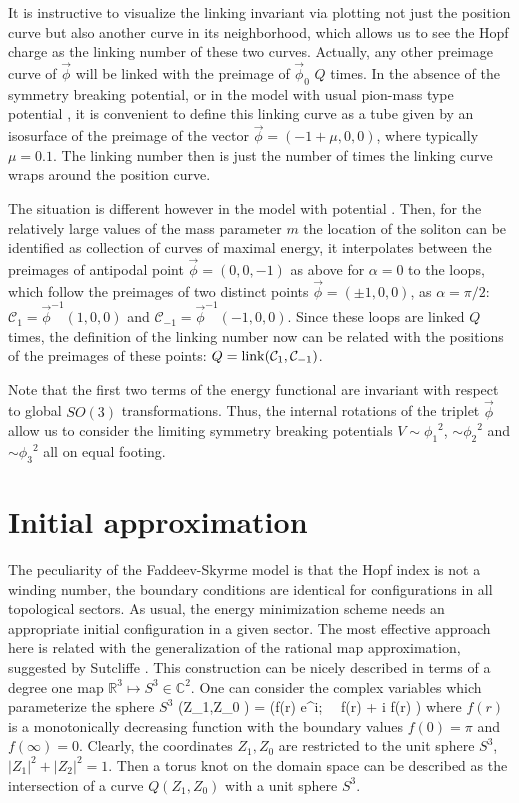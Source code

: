 \documentclass[12pt,a4paper]{article}
\begin{document}
It is instructive to visualize the linking invariant via plotting not just the position curve but also another
curve in its neighborhood, which allows us to see the Hopf charge as the linking number of these two
curves. Actually, any other preimage curve of $\vec\phi$ will be linked with the preimage of $\vec\phi_0$ $Q$ times.
In the absence of the symmetry breaking potential, or in the model with usual pion-mass type potential \cite{Foster:2010zb},
it is convenient to define this linking curve
as a tube given by an isosurface of the preimage of the vector $\vec \phi= (-1+\mu, 0, 0)$, where typically $\mu=0.1$.
The linking number then is just the number of times the linking curve wraps around the position curve.

The situation is different however in the model  with potential . Then, for the relatively large values of the
mass parameter $m$ the location of the soliton can be identified
as collection of curves of maximal energy, it interpolates between the preimages of antipodal point  $\vec\phi
= (0,0,-1)$ as above for
$\alpha=0$ to the loops, which follow the preimages of two distinct points $\vec\phi = (\pm 1,0,0)$,
as $\alpha=\pi/2$: $\mathcal{C}_1 = \vec \phi^{-1}(1,0,0)$ and $\mathcal{C}_{-1} = \vec \phi^{-1}(-1,0,0)$.
Since these loops are linked $Q$ times, the definition of the linking number now can be related with
the positions of the preimages of these points: $Q= {\rm link} (\mathcal{C}_1,\mathcal{C}_{-1})$.

Note that the first two terms of the energy functional  are invariant with respect to
global $SO(3)$ transformations. Thus, the internal rotations of the triplet $\vec \phi$
allow us to consider the limiting symmetry breaking
potentials $V\sim{\phi_1}^2$, $\sim{\phi_2}^2$ and $\sim{\phi_3}^2$ all on equal footing.



\section{Initial approximation}
The peculiarity of the Faddeev-Skyrme model is that the Hopf index is not a winding number,
the boundary conditions are identical for
configurations in all topological sectors. As usual, the energy minimization scheme needs an appropriate initial configuration
in a given sector. The most effective approach here is related with the
generalization of the rational map approximation, suggested by Sutcliffe \cite{Sutcliffe:2007ui}.
This construction can be nicely described in terms of a degree one map $\mathbb{R}^3 \mapsto S^3 \in \mathbb{C}^2$.
One can consider the complex variables which parameterize the sphere $S^3$ \cite{Sutcliffe:2007ui}
\be
\left(Z_1,Z_0 \right) = \left(\sin f(r) \sin \theta e^{i\varphi};~~ \cos f(r) + i \sin f(r) \cos \theta \right)
\label{rational-Hopf}
\ee
where $f(r)$ is a monotonically decreasing function with the boundary values $f(0)=\pi$ and $f(\infty)=0$.
Clearly,  the coordinates $Z_1,Z_0$
are restricted to the unit sphere $S^3$, $|Z_1|^2 + |Z_2|^2=1$.
Then a torus knot on the domain space can be described as the intersection of a curve $Q(Z_1,Z_0)$ with a unit sphere
$S^3$.
\end{document}
